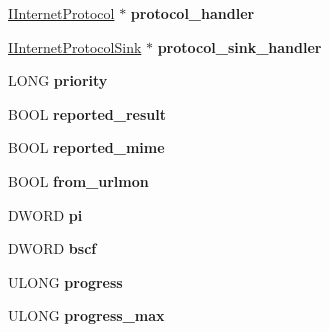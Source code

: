 \begin{DoxyCompactItemize}
\begin{tabbing}
\end{tabbing}\item 
\mbox{\label{struct_bind_protocol_a64aa93cedac045234dfcc02b5663b1be}} 
\hyperlink{interface_i_internet_protocol}{I\+Internet\+Protocol} $\ast$ {\bfseries protocol\+\_\+handler}
\item 
\mbox{\label{struct_bind_protocol_a6d5c9e92de063b489a912ced14808a9b}} 
\hyperlink{interface_i_internet_protocol_sink}{I\+Internet\+Protocol\+Sink} $\ast$ {\bfseries protocol\+\_\+sink\+\_\+handler}
\item 
\mbox{\label{struct_bind_protocol_aa7ef6e3a8cf4fbc35cbc1afed80846cb}} 
L\+O\+NG {\bfseries priority}
\item 
\mbox{\label{struct_bind_protocol_a6e2e4cde909df1406258c210b0d16aca}} 
B\+O\+OL {\bfseries reported\+\_\+result}
\item 
\mbox{\label{struct_bind_protocol_ac1524d8db50d76fbe23870486a295f77}} 
B\+O\+OL {\bfseries reported\+\_\+mime}
\item 
\mbox{\label{struct_bind_protocol_aa24d4af1fab2aaedd503e7f7bd3c8b2b}} 
B\+O\+OL {\bfseries from\+\_\+urlmon}
\item 
\mbox{\label{struct_bind_protocol_a4ac7ea72f6116c3eca4bf70e0860209c}} 
D\+W\+O\+RD {\bfseries pi}
\item 
\mbox{\label{struct_bind_protocol_aeb83c32ecf90afe90a2ef1c5b0719643}} 
D\+W\+O\+RD {\bfseries bscf}
\item 
\mbox{\label{struct_bind_protocol_aa16e46a641ed3c5476a57bb24671afff}} 
U\+L\+O\+NG {\bfseries progress}
\item 
\mbox{\label{struct_bind_protocol_a5b308de8c2d32e3147628721cad0003f}} 
U\+L\+O\+NG {\bfseries progress\+\_\+max}
\item 
\mbox{\label{struct_bind_protocol_a4733db11f1c553129287f21543889ef4}} 

\end{DoxyCompactItemize}
